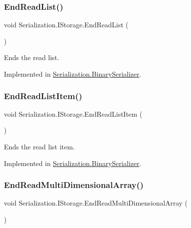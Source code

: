 \subsubsection{\texorpdfstring{End\+Read\+List()}{EndReadList()}}
{\footnotesize\ttfamily void Serialization.\+I\+Storage.\+End\+Read\+List (\begin{DoxyParamCaption}{ }\end{DoxyParamCaption})}



Ends the read list. 



Implemented in \hyperlink{class_serialization_1_1_binary_serializer_aa4cb3eb6253054c5fe8bbebdc9c30c2f}{Serialization.\+Binary\+Serializer}.

\mbox{\label{interface_serialization_1_1_i_storage_a8308151ce64440db9ac2c385e3b96d45}} 
\subsubsection{\texorpdfstring{End\+Read\+List\+Item()}{EndReadListItem()}}
{\footnotesize\ttfamily void Serialization.\+I\+Storage.\+End\+Read\+List\+Item (\begin{DoxyParamCaption}{ }\end{DoxyParamCaption})}



Ends the read list item. 



Implemented in \hyperlink{class_serialization_1_1_binary_serializer_af0b58fefbd4bea88a09cffc7bdcef862}{Serialization.\+Binary\+Serializer}.

\mbox{\label{interface_serialization_1_1_i_storage_a449e4d99ff1a5e1a792e22955fb13018}} 
\subsubsection{\texorpdfstring{End\+Read\+Multi\+Dimensional\+Array()}{EndReadMultiDimensionalArray()}}
{\footnotesize\ttfamily void Serialization.\+I\+Storage.\+End\+Read\+Multi\+Dimensional\+Array (\begin{DoxyParamCaption}{ }\end{DoxyParamCaption})}



